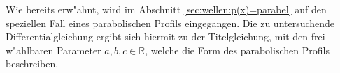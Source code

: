 Wie bereits erw"ahnt, wird im Abschnitt \ref{sec:wellen:p(x)=parabel} auf den 
speziellen Fall eines parabolischen Profils eingegangen. Die zu untersuchende 
Differentialgleichung ergibt sich hiermit zu der Titelgleichung, mit den frei 
w"ahlbaren Parameter ${a,b,c} \in \mathbb{R}$, welche die Form des 
parabolischen Profils beschreiben.